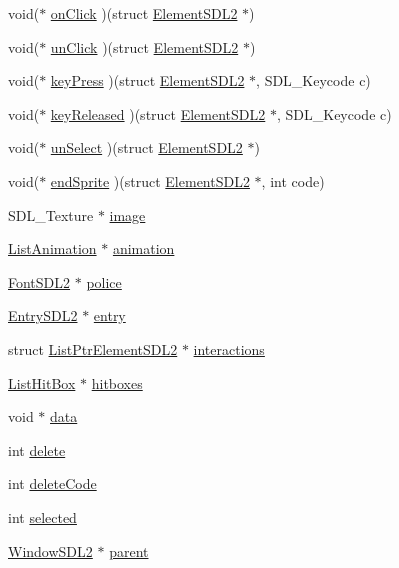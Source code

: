 \begin{DoxyCompactItemize}
void($\ast$ \hyperlink{structElementSDL2_ae56c022599e2e8acdda29fbb8af44942}{on\+Click} )(struct \hyperlink{structElementSDL2}{Element\+S\+D\+L2} $\ast$)
\item 
void($\ast$ \hyperlink{structElementSDL2_a0ad4094686063db36244b474fe42a336}{un\+Click} )(struct \hyperlink{structElementSDL2}{Element\+S\+D\+L2} $\ast$)
\item 
void($\ast$ \hyperlink{structElementSDL2_aff1dc935700d44a0ef0d53de7cca9d41}{key\+Press} )(struct \hyperlink{structElementSDL2}{Element\+S\+D\+L2} $\ast$, S\+D\+L\+\_\+\+Keycode c)
\item 
void($\ast$ \hyperlink{structElementSDL2_a76ecf85adcb072db772a8351ea7e04ee}{key\+Released} )(struct \hyperlink{structElementSDL2}{Element\+S\+D\+L2} $\ast$, S\+D\+L\+\_\+\+Keycode c)
\item 
void($\ast$ \hyperlink{structElementSDL2_a8057ee0d19cdd60ec568076206ee0e12}{un\+Select} )(struct \hyperlink{structElementSDL2}{Element\+S\+D\+L2} $\ast$)
\item 
void($\ast$ \hyperlink{structElementSDL2_aa857e06629320966e80bd437050b07e8}{end\+Sprite} )(struct \hyperlink{structElementSDL2}{Element\+S\+D\+L2} $\ast$, int code)
\item 
S\+D\+L\+\_\+\+Texture $\ast$ \hyperlink{structElementSDL2_aab2ff0fd3a1c4370d7f1f9cdd250d056}{image}
\item 
\hyperlink{structListAnimation}{List\+Animation} $\ast$ \hyperlink{structElementSDL2_a9b7927abbd7b67f843758ff65436fbb5}{animation}
\item 
\hyperlink{structFontSDL2}{Font\+S\+D\+L2} $\ast$ \hyperlink{structElementSDL2_a785d4fada0ba0ac6b5ce7a53c379f8cd}{police}
\item 
\hyperlink{structEntrySDL2}{Entry\+S\+D\+L2} $\ast$ \hyperlink{structElementSDL2_a9c99c1c34dcf0e52baaca7a64598bd8a}{entry}
\item 
struct \hyperlink{structListPtrElementSDL2}{List\+Ptr\+Element\+S\+D\+L2} $\ast$ \hyperlink{structElementSDL2_aca39f22199862196fc52dfcecafeca4a}{interactions}
\item 
\hyperlink{structListHitBox}{List\+Hit\+Box} $\ast$ \hyperlink{structElementSDL2_aa4af7ab8949d93544da609659a4011c0}{hitboxes}
\item 
void $\ast$ \hyperlink{structElementSDL2_abca7de78cc7e420d98d24a955563c7cc}{data}
\item 
int \hyperlink{structElementSDL2_a59d6b7086533d8d7da883bc882c4ef6d}{delete}
\item 
int \hyperlink{structElementSDL2_a1f8620d697afd711263d20dd82077cd0}{delete\+Code}
\item 
int \hyperlink{structElementSDL2_a2cae92fe5dd207db485261128b82bc02}{selected}
\item 
\hyperlink{structWindowSDL2}{Window\+S\+D\+L2} $\ast$ \hyperlink{structElementSDL2_a9cd0b68349b49321423bec3136cf7e6e}{parent}
\end{DoxyCompactItemize}


